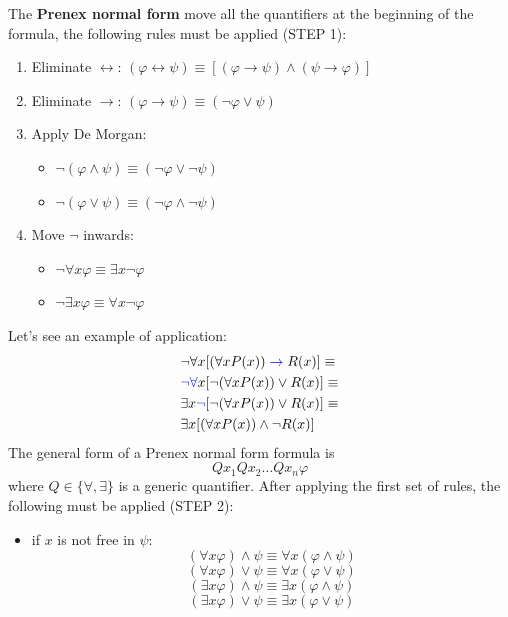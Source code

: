\documentclass[10pt, letterpaper]{report}
\begin{document}
\noindent The \textbf{Prenex normal form} move all the quantifiers at the beginning of the formula, the following rules must be applied (STEP 1):\begin{enumerate}
    \item Eliminate $\leftrightarrow$: $(\varphi\leftrightarrow\psi)\equiv [(\varphi\rightarrow\psi)\land(\psi\rightarrow\varphi)]$
    \item Eliminate $\rightarrow$: $(\varphi\rightarrow\psi)\equiv (\lnot\varphi\lor\psi)$
    \item Apply De Morgan: \begin{itemize}
        \item $\lnot(\varphi\land\psi)\equiv (\lnot \varphi\lor\lnot\psi)$
        \item $\lnot(\varphi\lor\psi)\equiv (\lnot \varphi\land\lnot\psi)$
    \end{itemize}
    \item Move $\lnot$ inwards: \begin{itemize}
        \item $\lnot \forall x \varphi \equiv \exists x \lnot \varphi$
        \item $\lnot\exists x \varphi\equiv \forall x \lnot \varphi$
    \end{itemize}
\end{enumerate}
Let's see an example of application:\begin{align*}
    &\lnot\forall x[(\forall x P(x))\color{blue}\rightarrow\color{black} R(x)]\equiv\\
    &\color{blue}\lnot\forall\color{black} x[\lnot(\forall x P(x))\lor R(x)]\equiv\\
    &\exists x \color{blue}\lnot\color{black}[\lnot (\forall xP(x))\lor R(x) ]\equiv\\
    &\exists x [ (\forall xP(x))\land \lnot R(x) ]
\end{align*}
The general form of a Prenex normal form formula is\begin{equation}
    Qx_1Qx_2\dots Qx_n\varphi 
\end{equation}
where $Q\in \{\forall,\exists\}$ is a generic quantifier. After applying the first set of rules, the following must be applied (STEP 2):\begin{itemize}
    \item if $x$ is not free in $\psi$: $$ 
    (\forall x\varphi)\land \psi \equiv \forall x(\varphi\land\psi)
    $$
    $$ 
    (\forall x\varphi)\lor \psi \equiv \forall x(\varphi\lor\psi)
    $$
    $$ 
    (\exists x\varphi)\land \psi \equiv \exists x(\varphi\land\psi)
    $$
    $$ 
    (\exists x\varphi)\lor \psi \equiv \exists x(\varphi\lor\psi)
    $$
\end{itemize}
\end{document}
